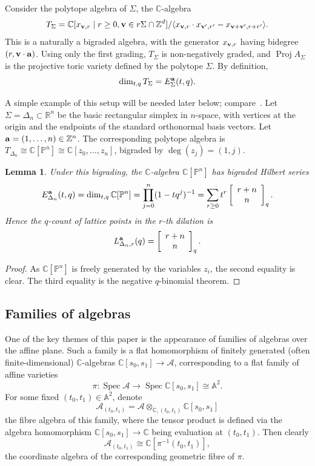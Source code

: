 \documentclass[a4paper,11pt]{amsart}
\theoremstyle{plain}
\newtheorem{lemma}[theorem]{Lemma}
\theoremstyle{definition}
\newcommand{\A}{\mathbb{A}}
\newcommand{\C}{\mathbb{C}}
\newcommand{\pa}{T} %
\renewcommand{\P}{\mathbb{P}}
\newcommand{\R}{\mathbb{R}}
\newcommand{\Z}{\mathbb{Z}}
\DeclareMathOperator{\Spec}{Spec}
\DeclareMathOperator{\Proj}{Proj}
\newcommand{\ba}{{\bf a}}
\newcommand{\bv}{{\bf v}}
\begin{document}
Consider the polytope algebra of $\Sigma$, the $\C$-algebra
\[
\pa_\Sigma =  \C[x_{\bv,r} \mid r\geq 0, \bv \in r\Sigma \cap \Z^d]/\langle  x_{\bv,r}\cdot x_{\bv',r'} - x_{\bv+\bv', r+r'}\rangle.\]
This is a naturally a bigraded algebra, with the generator $x_{\bv,r}$ having bidegree $(r,\bv\cdot \ba)$. Using only the first grading, $\pa_\Sigma$ is non-negatively graded, and $\Proj A_\Sigma$ is the projective toric variety defined by the polytope $\Sigma$. By definition, 
\[\dim_{t,q} \pa_\Sigma =E^\ba_{\Sigma}(t,q).\]

A simple example of this setup  will be needed later below; compare~\cite{AS}. Let $\Sigma=\Delta_n\subset\R^n$  be the basic rectangular simplex in $n$-space, with vertices at the origin and the endpoints of the standard orthonormal basis vectors. Let $\ba=(1,\ldots, n)\in\Z^n$. The corresponding polytope algebra is  $\pa_{\Delta_n}\cong\C[\P^n]\cong \C[z_0,\dots, z_n]$, bigraded by $\deg(z_j)=(1,j)$.
\begin{lemma} \label{lem:Pn}
Under this bigrading, the $\C$-algebra $\C[\P^n]$ has bigraded Hilbert series
\begin{equation}
E^\ba_{\Delta_n}(t,q) = \dim_{t,q} \C[\P^n] =\prod_{j=0}^n (1-tq^j)^{-1} =  \sum_{r\geq 0}  t^r \left[\begin{array}{c} r+n\\ n\end{array}\right]_q.
\label{qseries}
\end{equation}
Hence the $q$-count of lattice points in the $r$-th dilation is
\[ L^\ba_{\Delta_n,r}(q) = \left[\begin{array}{c} r+n\\ n\end{array}\right]_q.\]
\end{lemma}
\begin{proof} As $\C[\P^n]$ is freely generated by the variables $z_i$, the second equality is clear. The third equality is the negative $q$-binomial theorem. 
\end{proof} 

\subsection{Families of algebras} One of the key themes of this paper is the appearance of families of algebras over the affine plane. Such a family is a flat homomorphism of finitely generated (often finite-dimensional) $\C$-algebras $\C[s_0, s_1]\rightarrow \mathcal{A}$, corresponding to a flat family of affine varieties
\[\pi\colon \Spec\mathcal{A} \to \Spec\C[s_0, s_1]\cong{\mathbb A}^2. 
\]
For some fixed $(t_0, t_1)\in\A^2$, denote 
\[
\mathcal{A}_{(t_0, t_1)} = \mathcal{A}\otimes_{\C,(t_0, t_1)} \C[s_0, s_1]
\]
the fibre algebra of this family, where the tensor product is defined via the algebra homomorphism $\C[s_0, s_1]\to\C$ being evaluation at $(t_0,t_1)$. Then clearly
\[\mathcal{A}_{(t_0, t_1)}  \cong \C[\pi^{-1}(t_0, t_1)],
\]
the coordinate algebra of the corresponding geometric fibre of $\pi$. 
\end{document}
